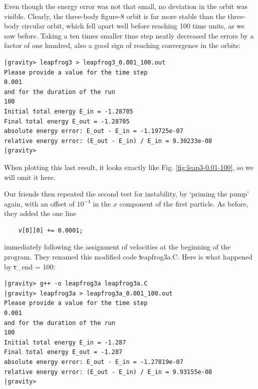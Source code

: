 Even though the energy error was not that small, no deviation in the
orbit was visible.  Clearly, the three-body figure-8 orbit is far more
stable than the three-body circular orbit, which fell apart well
before reaching 100 time units, as we saw before.  Taking a ten times
smaller time step neatly decreased the errors by a factor of one hundred,
also a good sign of reaching convergence in the orbits:

\begin{small}
\begin{verbatim}
|gravity> leapfrog3 > leapfrog3_0.001_100.out
Please provide a value for the time step
0.001
and for the duration of the run
100
Initial total energy E_in = -1.28705
Final total energy E_out = -1.28705
absolute energy error: E_out - E_in = -1.19725e-07
relative energy error: (E_out - E_in) / E_in = 9.30233e-08
|gravity>
\end{verbatim}
\end{small}

When plotting this last result, it looks exactly like
Fig. \ref{fig:leap3-0.01-100}, so we will omit it here.

Our friends then repeated the second test for instability, by `priming
the pump' again, with an offset of $10^{-4}$ in the $x$ component of
the first particle.  As before, they added the one line

\begin{small}
\begin{verbatim}
    v[0][0] += 0.0001;
\end{verbatim}
\end{small}

\noindent
immediately following the assignment of velocities at the beginning of
the program.  They renamed this modified code {\st leapfrog3a.C}.
Here is what happened by {\st t\_end = 100}:

\begin{small}
\begin{verbatim}
|gravity> g++ -o leapfrog3a leapfrog3a.C
|gravity> leapfrog3a > leapfrog3a_0.001_100.out
Please provide a value for the time step
0.001
and for the duration of the run
100
Initial total energy E_in = -1.287
Final total energy E_out = -1.287
absolute energy error: E_out - E_in = -1.27819e-07
relative energy error: (E_out - E_in) / E_in = 9.93155e-08
|gravity>
\end{verbatim}
\end{small}

